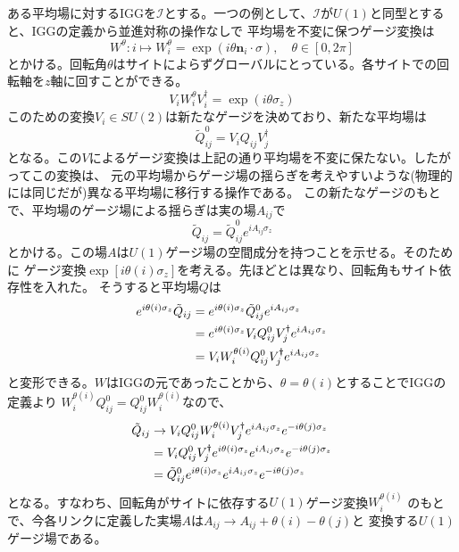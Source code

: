 \documentclass[11pt, aps, longbibliography]{article}
\begin{document}
    ある平均場に対するIGGを$\mathcal{I}$とする。一つの例として、$\mathcal{I}$が$U(1)$と同型とすると、IGGの定義から並進対称の操作なしで
    平均場を不変に保つゲージ変換は
    \begin{equation}\label{eq:3-4-2}
        W^\theta: i \mapsto W_i^\theta = \exp(i\theta \boldsymbol{n}_i \cdot \sigma), \quad \theta \in [0,2\pi]
    \end{equation}
    とかける。回転角$\theta$はサイトによらずグローバルにとっている。各サイトでの回転軸を$z$軸に回すことができる。
    \begin{equation}\label{eq:3-4-3}
        V_i W_i^\theta V_i^\dagger = \exp(i\theta \sigma_z)
    \end{equation}
    このための変換$V_i\in SU(2)$は新たなゲージを決めており、新たな平均場は
    \begin{equation}\label{eq:3-4-4}
        \tilde{Q}_{ij}^0 = V_iQ_{ij}V_j^\dagger
    \end{equation}
    となる。この$V$によるゲージ変換は上記の通り平均場を不変に保たない。したがってこの変換は、
    元の平均場からゲージ場の揺らぎを考えやすいような(物理的には同じだが)異なる平均場に移行する操作である。
    この新たなゲージのもとで、平均場のゲージ場による揺らぎは実の場$A_{ij}$で
    \begin{equation}\label{eq:3-4-5}
        \tilde{Q}_{ij} = \tilde{Q}_{ij}^0e^{iA_{ij}\sigma_z}
    \end{equation}
    とかける。この場$A$は$U(1)$ゲージ場の空間成分を持つことを示せる。そのために
    ゲージ変換$\exp[i\theta(i)\sigma_z]$を考える。先ほどとは異なり、回転角もサイト依存性を入れた。
    そうすると平均場$Q$は
    \begin{align}\label{eq:3-4-6}
        e^{i\theta(i)\sigma_z} \tilde{Q}_{ij} &= e^{i\theta(i)\sigma_z}\tilde{Q}_{ij}^0e^{iA_{ij}\sigma_z} \notag \\
        &= e^{i\theta(i)\sigma_z} V_i Q_{ij}^0 V_j^\dagger e^{iA_{ij}\sigma_z} \notag \\
        &= V_i W_i^{\theta(i)}Q_{ij}^0 V_j^\dagger e^{iA_{ij}\sigma_z} 
    \end{align}
    と変形できる。$W$はIGGの元であったことから、$\theta = \theta(i)$とすることでIGGの定義より
    $W_i^{\theta(i)}Q_{ij}^0 = Q_{ij}^0W_i^{\theta(i)}$なので、
    \begin{align}\label{eq:3-4-7}
        \tilde{Q}_{ij} &\rightarrow V_i Q_{ij}^0 W_i^{\theta(i)} V_j^\dagger e^{iA_{ij}\sigma_z} e^{-i\theta(j)\sigma_z} \notag \\
        &= V_i Q_{ij}^0 V_j^\dagger e^{i\theta(i)\sigma_z} e^{iA_{ij}\sigma_z} e^{-i\theta(j)\sigma_z} \notag \\
        &= \tilde{Q}_{ij}^0 e^{i\theta(i)\sigma_z} e^{iA_{ij}\sigma_z} e^{-i\theta(j)\sigma_z}
    \end{align}
    となる。すなわち、回転角がサイトに依存する$U(1)$ゲージ変換$W_i^{\theta(i)}$
    のもとで、今各リンクに定義した実場$A$は$A_{ij}\rightarrow A_{ij} + \theta(i)- \theta(j)$と
    変換する$U(1)$ゲージ場である。
\end{document}
